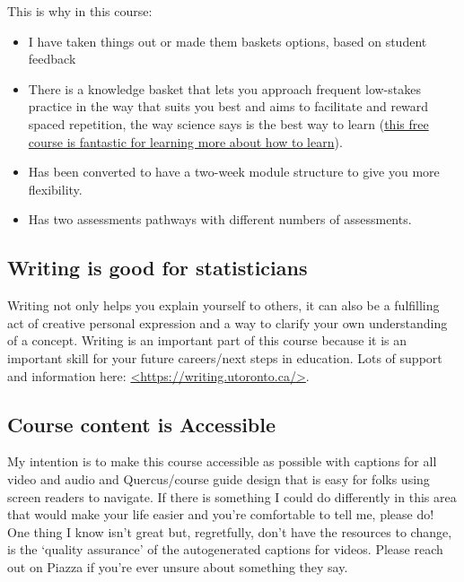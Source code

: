 \documentclass[
  openany]{book}
\begin{document}
This is why in this course:

\begin{itemize}
\item
  I have taken things out or made them baskets options, based on student feedback
\item
  There is a knowledge basket that lets you approach frequent low-stakes practice in the way that suits you best and aims to facilitate and reward spaced repetition, the way science says is the best way to learn (\href{http://www.coursera.org/learn/learning-how-to-learn}{this free course is fantastic for learning more about how to learn}).
\item
  Has been converted to have a two-week module structure to give you more flexibility.
\item
  Has two assessments pathways with different numbers of assessments.
\end{itemize}

\hypertarget{writing-is-good-for-statisticians}{%
\subsection{Writing is good for statisticians}\label{writing-is-good-for-statisticians}}

Writing not only helps you explain yourself to others, it can also be a fulfilling act of creative personal expression and a way to clarify your own understanding of a concept. Writing is an important part of this course because it is an important skill for your future careers/next steps in education. Lots of support and information here: \href{https://writing.utoronto.ca}{\textless https://writing.utoronto.ca/\textgreater{}}.

\hypertarget{course-content-is-accessible}{%
\subsection{Course content is Accessible}\label{course-content-is-accessible}}

My intention is to make this course accessible as possible with captions for all video and audio and Quercus/course guide design that is easy for folks using screen readers to navigate. If there is something I could do differently in this area that would make your life easier and you're comfortable to tell me, please do! One thing I know isn't great but, regretfully, don't have the resources to change, is the `quality assurance' of the autogenerated captions for videos. Please reach out on Piazza if you're ever unsure about something they say.
\end{document}
